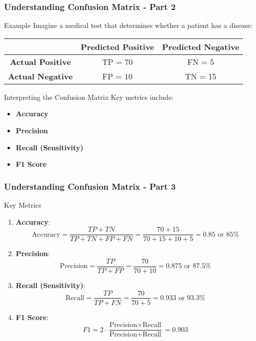 \documentclass[aspectratio=169]{beamer}
\begin{document}
\begin{frame}[fragile]
    \frametitle{Understanding Confusion Matrix - Part 2}
    \begin{block}{Example}
        Imagine a medical test that determines whether a patient has a disease:
        \begin{center}
        \begin{tabular}{|c|c|c|}
            \hline
            & \textbf{Predicted Positive} & \textbf{Predicted Negative} \\
            \hline
            \textbf{Actual Positive} & TP = 70 & FN = 5 \\
            \hline
            \textbf{Actual Negative} & FP = 10 & TN = 15 \\
            \hline
        \end{tabular}
        \end{center}
    \end{block}
    
    \begin{block}{Interpreting the Confusion Matrix}
        Key metrics include:
        \begin{itemize}
            \item \textbf{Accuracy}
            \item \textbf{Precision}
            \item \textbf{Recall (Sensitivity)}
            \item \textbf{F1 Score}
        \end{itemize}
    \end{block}
\end{frame}

\begin{frame}[fragile]
    \frametitle{Understanding Confusion Matrix - Part 3}
    \begin{block}{Key Metrics}
        \begin{enumerate}
            \item \textbf{Accuracy}:
            \[
            \text{Accuracy} = \frac{TP + TN}{TP + TN + FP + FN} = \frac{70 + 15}{70 + 15 + 10 + 5} = 0.85 \text{ or } 85\%
            \]
            \item \textbf{Precision}:
            \[
            \text{Precision} = \frac{TP}{TP + FP} = \frac{70}{70 + 10} = 0.875 \text{ or } 87.5\%
            \]
            \item \textbf{Recall (Sensitivity)}:
            \[
            \text{Recall} = \frac{TP}{TP + FN} = \frac{70}{70 + 5} = 0.933 \text{ or } 93.3\%
            \]
            \item \textbf{F1 Score}:
            \[
            F1 = 2 \cdot \frac{\text{Precision} \times \text{Recall}}{\text{Precision} + \text{Recall}} = 0.903
            \]
        \end{enumerate}
    \end{block}
\end{frame}
\end{document}
